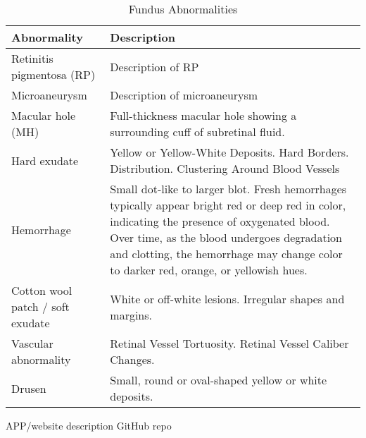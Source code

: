 \documentclass{article}
\begin{document}
		{
			\fontsize{9}{12}\selectfont
			{
				\begin{longtable}{lp{3.8in}}
					\caption{Fundus Abnormalities}
					\label{tb:fundus-ab}\\
					\toprule
					Abnormality&Description\\
					\toprule
					
					\multicolumn{1}{l}{Retinitis pigmentosa (RP)}
					& Description of RP\\
					
					\multicolumn{1}{l}{Microaneurysm}
					& Description of microaneurysm\\
					
					\multicolumn{1}{l}{Macular hole (MH)} & Full-thickness macular hole showing a surrounding cuff of subretinal fluid.\\
					
					\multicolumn{1}{l}{Hard exudate} & Yellow or Yellow-White Deposits.  Hard Borders.  Distribution.  Clustering Around Blood Vessels\\
					
					\multicolumn{1}{l}{Hemorrhage} & Small dot-like to larger blot.  Fresh hemorrhages typically appear bright red or deep red in color, indicating the presence of oxygenated blood. Over time, as the blood undergoes degradation and clotting, the hemorrhage may change color to darker red, orange, or yellowish hues.\\
					
					\multicolumn{1}{l}{Cotton wool patch / soft exudate} & White or off-white lesions.  Irregular shapes and margins.\\
					
					\multicolumn{1}{l}{Vascular abnormality} & Retinal Vessel Tortuosity.  Retinal Vessel Caliber Changes.  \\
					
					\multicolumn{1}{l}{Drusen} & Small, round or oval-shaped yellow or white deposits.\\
					
					\bottomrule
				\end{longtable}
			}
		}
		
		
		APP/website description
		GitHub repo

	\newrefcontext[sorting=nyt]
	\printbibliography
	
\end{document}
